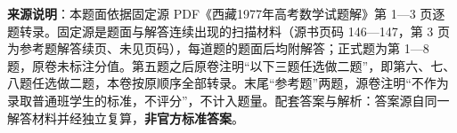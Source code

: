 


\begin{gktip}
\textbf{来源说明}：本题面依据固定源 PDF《西藏1977年高考数学试题解》第 1—3 页逐题转录。固定源是题面与解答连续出现的扫描材料（源书页码 146—147，第 3 页为参考题解答续页、未见页码），每道题的题面后均附解答；正式题为第 1—8 题，原卷未标注分值。第五题之后原卷注明“以下三题任选做二题”，即第六、七、八题任选做二题，本卷按原顺序全部转录。末尾“参考题”两题，源卷注明“不作为录取普通班学生的标准，不评分”，不计入题量。配套答案与解析：答案源自同一解答材料并经独立复算，\textbf{非官方标准答案}。
\end{gktip}

\par\medskip

